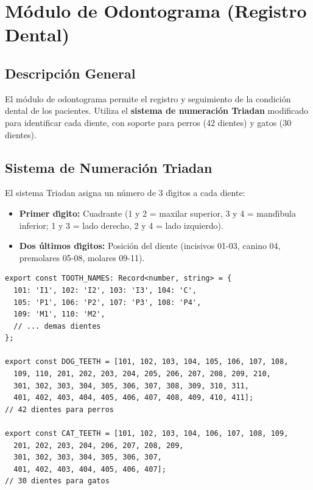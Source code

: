 \chapter{M\'odulo de Odontograma (Registro Dental)}

\section{Descripci\'on General}

El m\'odulo de odontograma permite el registro y seguimiento de la
condici\'on dental de los pacientes. Utiliza el \textbf{sistema de
numeraci\'on Triadan} modificado para identificar cada diente, con
soporte para perros (42 dientes) y gatos (30 dientes).

\section{Sistema de Numeraci\'on Triadan}

El sistema Triadan asigna un n\'umero de 3 d\'{\i}gitos a cada diente:

\begin{itemize}[leftmargin=*]
    \item \textbf{Primer d\'{\i}gito:} Cuadrante (1 y 2 = maxilar superior,
          3 y 4 = mand\'{\i}bula inferior; 1 y 3 = lado derecho, 2 y 4 =
          lado izquierdo).
    \item \textbf{Dos \'ultimos d\'{\i}gitos:} Posici\'on del diente
          (incisivos 01-03, canino 04, premolares 05-08, molares 09-11).
\end{itemize}

\begin{lstlisting}[style=typescript, caption=Numeracion Triadan desde constantes compartidas]
export const TOOTH_NAMES: Record<number, string> = {
  101: 'I1', 102: 'I2', 103: 'I3', 104: 'C',
  105: 'P1', 106: 'P2', 107: 'P3', 108: 'P4',
  109: 'M1', 110: 'M2',
  // ... demas dientes
};

export const DOG_TEETH = [101, 102, 103, 104, 105, 106, 107, 108,
  109, 110, 201, 202, 203, 204, 205, 206, 207, 208, 209, 210,
  301, 302, 303, 304, 305, 306, 307, 308, 309, 310, 311,
  401, 402, 403, 404, 405, 406, 407, 408, 409, 410, 411];
// 42 dientes para perros

export const CAT_TEETH = [101, 102, 103, 104, 106, 107, 108, 109,
  201, 202, 203, 204, 206, 207, 208, 209,
  301, 302, 303, 304, 305, 306, 307,
  401, 402, 403, 404, 405, 406, 407];
// 30 dientes para gatos
\end{lstlisting}

